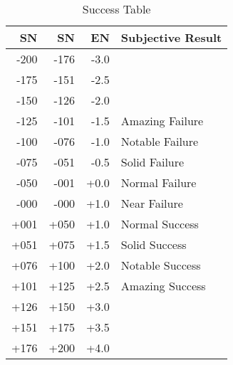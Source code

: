 \begin{table}[hb]
\centering
\caption{Success Table}
	\begin{tabular}{||r|r||r|l|} \hline
	SN		&	SN	& EN 	& Subjective Result \\ \hline
	-200	& -176	& -3.0 	& \\
    -175	& -151	& -2.5 	& \\
	-150	& -126  & -2.0 	& \\
	-125   	& -101	& -1.5 	& Amazing Failure \\
	-100   	& -076	& -1.0 	& Notable Failure \\
	-075   	& -051	& -0.5 	& Solid Failure \\
	-050   	& -001	& +0.0 	& Normal Failure \\
	-000   	& -000	& +1.0 	& Near  Failure \\
	+001   	& +050	& +1.0 	& Normal Success \\
	+051   	& +075	& +1.5 	& Solid Success \\
	+076   	& +100	& +2.0 	& Notable Success \\
	+101   	& +125	& +2.5 	& Amazing Success \\
	+126   	& +150	& +3.0 	& \\  
	+151	& +175  & +3.5 	& \\
    +176	& +200	& +4.0 	& \\  \hline
	\end{tabular}
\end{table}
